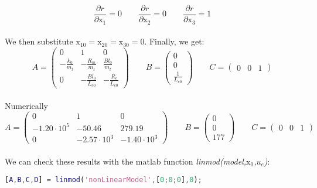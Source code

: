 \begin{equation*}
\frac{\partial{r}}{\partial{\text{x}_{1}}} = 0 \qquad 
\frac{\partial{r}}{\partial{\text{x}_{2}}} = 0 \qquad
\frac{\partial{r}}{\partial{\text{x}_{3}}} = 1
\end{equation*}\\
We then substitute $\text{x}_{10} = \text{x}_{20} = \text{x}_{30} = 0$.
Finally, we get:
\begin{equation*} A = \begin{pmatrix}
   0 & 1 & 0 \\
   -\frac{k_0}{m_t} & -\frac{R_m}{m_t} & \frac{Bl_0}{m_t} \\
  0 & - \frac{Bl_0}{L_{e0}} & - \frac{R_e}{L_{e0}}  
\end{pmatrix}
\qquad B = \begin{pmatrix}
0 \\
0 \\
\frac{1}{L_{e0}}
\end{pmatrix}
\qquad C = \begin{pmatrix}
	0 & 0 & 1 
\end{pmatrix}
\end{equation*}\\
Numerically
\begin{equation*} A = \begin{pmatrix}
   0 & 1 & 0 \\
  -1.20 \cdot 10^5 & -50.46 & 279.19 \\
  0 & -2.57 \cdot 10^3 & -1.40 \cdot 10^3
\end{pmatrix}
\qquad B = \begin{pmatrix}
0 \\
0 \\
177
\end{pmatrix}
\qquad C = \begin{pmatrix}
	0 & 0 & 1 
\end{pmatrix}
\end{equation*}\\
We can check these results with the matlab function \textit{linmod(model,$\text{x}_0$,$u_e$)}:
\vspace*{-0.5cm}
\begin{lstlisting}[language=Matlab]
[A,B,C,D] = linmod('nonLinearModel',[0;0;0],0);
\end{lstlisting}